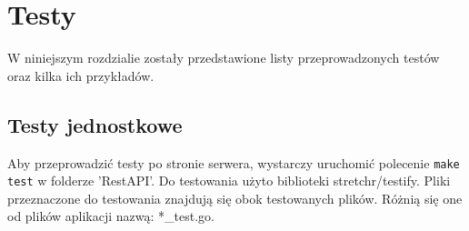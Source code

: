 \chapter{Testy}
\label{ch:Testy}
W niniejszym rozdzialie zostały przedstawione listy przeprowadzonych testów oraz kilka ich przykładów.
\section{Testy jednostkowe}
Aby przeprowadzić testy po stronie serwera, wystarczy uruchomić polecenie \texttt{make test} w folderze 'RestAPI'.
Do testowania użyto biblioteki stretchr/testify.
Pliki przeznaczone do testowania znajdują się obok testowanych plików. Różnią się one od plików aplikacji nazwą: *\_test.go.

